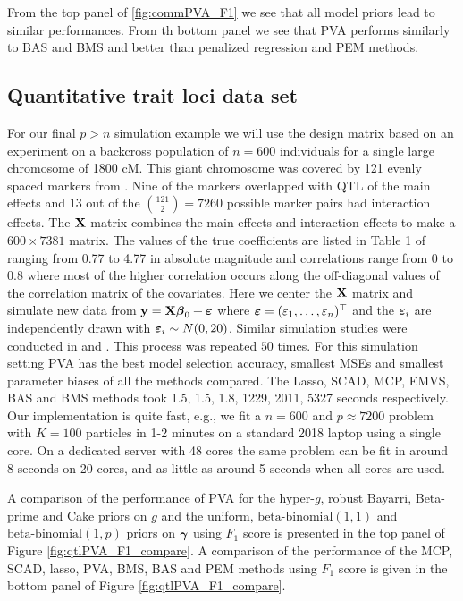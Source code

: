 From the top panel of \ref{fig:commPVA_F1} we see that 
all model priors
lead to similar performances.
From th bottom panel we see that PVA 
performs similarly to BAS and BMS
and better than penalized regression and PEM methods.

\subsection{Quantitative trait loci data set}
\label{sec:QTL}

    For our final $p>n$ simulation example we will use the design matrix based
    on an experiment on a backcross population of $n=600$ individuals for a
    single large chromosome of 1800 cM. This giant chromosome was covered by
    121 evenly spaced markers from \cite{Xu2007}. Nine of the markers
    overlapped with QTL of the main effects and 13 out of the ${121 \choose 2}
    = 7260$ possible marker pairs had interaction effects. The ${\bf X}$ matrix
    combines the main effects and interaction effects to make a $600\times
    7381$ matrix. The values of the true coefficients are listed in Table 1 of
    \cite{Xu2007} ranging from 0.77 to 4.77 in absolute magnitude and
    correlations range from 0 to 0.8 where most of the higher correlation
    occurs along the off-diagonal values of the correlation matrix of the
    covariates. Here we center the ${\bf X}$ matrix and simulate new data from ${\bf y}
    = {\bf X}{\boldsymbol \beta}_0 + {\boldsymbol \varepsilon}$ where ${\boldsymbol \varepsilon} =
    (\varepsilon_1,\ldots,\varepsilon_n)^\top$ and the ${\boldsymbol \varepsilon}_i$ are
    independently drawn with ${\boldsymbol \varepsilon}_i \sim N(0,20)$. Similar simulation
    studies were conducted in \cite{Xu2007} and \cite{Karkkainen2012}. This
    process was repeated $50$ times.  For this simulation setting PVA has the
    best model selection accuracy, smallest MSEs and smallest parameter biases
    of all the methods compared.  The Lasso, SCAD, MCP, EMVS, BAS and BMS
    methods took 1.5, 1.5, 1.8, 1229, 2011, 5327 seconds respectively. Our   implementation is quite fast, e.g.,
    we fit a $n=600$ and $p\approx 7200$ problem
    with $K=100$ particles in 1-2 minutes on a standard 2018 laptop using a single core. On a dedicated server with 48 cores the same problem can be fit in around 8 seconds on 20 cores, and as little as around 5 seconds when all cores are used.

A comparison of the performance of PVA for the hyper-$g$, robust Bayarri,
Beta-prime and Cake priors on $g$ and the uniform, $\text{beta-binomial}(1, 1)$
and \\ $\text{beta-binomial}(1, p)$ priors on ${\boldsymbol \gamma}$ using $F_1$ score is
presented in the top panel of Figure \ref{fig:qtlPVA_F1_compare}. A comparison of the performance of the
MCP, SCAD, lasso, PVA, BMS, BAS and PEM  methods using $F_1$ score is given in
the bottom panel of Figure \ref{fig:qtlPVA_F1_compare}.


